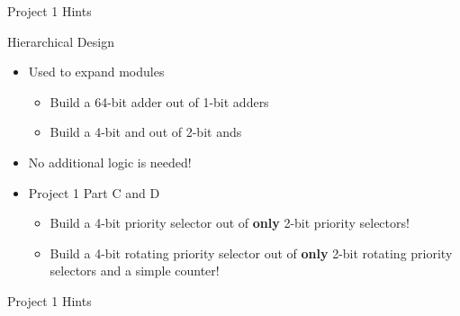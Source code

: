 \documentclass[table,dvipsnames,colorlinks=true]{beamer}
\begin{document}
\begin{frame}{Project 1 Hints}
    \begin{block}{Hierarchical Design}
        \begin{itemize}
            \item Used to expand modules
                \begin{itemize}
                    \item Build a 64-bit adder out of 1-bit adders
                    \item Build a 4-bit and out of 2-bit ands
                \end{itemize}
            \item No additional logic is needed!
            \item Project 1 Part C and D
                \begin{itemize}
                    \item Build a 4-bit priority selector out of \textbf{only} 2-bit priority
                        selectors!
                    \item Build a 4-bit rotating priority selector out of \textbf{only} 2-bit
                        rotating priority selectors and a simple counter!
                \end{itemize}
        \end{itemize}
    \end{block}
\end{frame}

\begin{frame}{Project 1 Hints}
        \inputminted[frame=lines,obeytabs,tabsize=4,fontsize=\scriptsize]{verilog}{verilog/and.v}
\end{frame}
\end{document}

